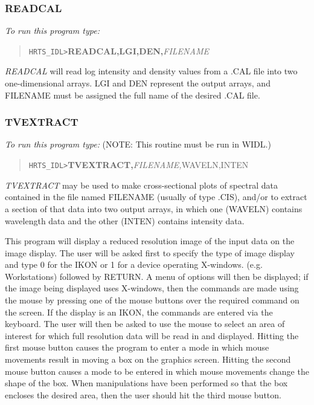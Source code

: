 \subsubsection{READCAL}

{\em To run this program type:}
\begin{quote}
{\tt HRTS\_IDL>}{\bf READCAL,LGI,DEN,}{\it FILENAME}          
\end{quote}
{\em READCAL} will read log intensity and density values from a .CAL file
   into two one-dimensional arrays.  LGI and DEN represent the output
   arrays, and FILENAME must be assigned the full name of the desired .CAL
   file.

\subsubsection{TVEXTRACT}                

{\em To run this program type:} (NOTE: This routine must be run in WIDL.)
\begin{quote}
{\tt HRTS\_IDL>}{\bf TVEXTRACT,}{\it FILENAME,}WAVELN,INTEN       
\end{quote}
{\em TVEXTRACT} may be used to make cross-sectional plots of spectral data
   contained in the file named FILENAME (usually of type .CIS), and/or to
   extract a section of that data into two output arrays, in which one
   (WAVELN) contains wavelength data and the other (INTEN) contains
   intensity data.

      This program will display a reduced resolution image of the input
   data on the image display. The user will be asked first to specify 
   the  type of image display and type 0 for the IKON or 1 for a device 
   operating X-windows. (e.g. Workstations) followed by RETURN. 
   A menu of options will then be displayed; if the image being 
   displayed uses X-windows, then the commands are made using the 
   mouse by pressing one of the mouse buttons over the required 
   command on the screen. If the display is an IKON, the commands are 
   entered via the keyboard.
   The user will then be asked to use the mouse to select
   an area of interest for which full resolution data will be read in and
   displayed.  Hitting the first mouse button causes the program to enter a
   mode in which mouse movements result in moving a box on the graphics
   screen.  Hitting the second mouse button causes a mode to be entered in
   which mouse movements change the shape of the box.  When manipulations
   have been performed so that the box encloses the desired area, then the
   user should hit the third mouse button.

